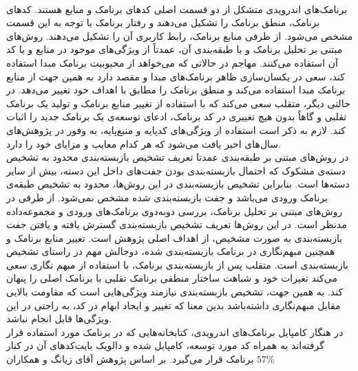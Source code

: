 \\
برنامک‌های اندرویدی متشکل از دو قسمت اصلی کد‌های برنامک و منابع هستند. کد‌های برنامک، منطق برنامک را تشکیل می‌دهند و رفتار برنامک با توجه به این قسمت مشخص  می‌شود. از طرفی منابع برنامک، رابط کاربری آن را تشکیل می‌دهند. روش‌های مبتنی بر تحلیل برنامک و یا طبقه‌بندی آن، عمدتاً از ویژگی‌های موجود در منابع و یا کد آن استفاده می‌کنند. مهاجم در حالاتی که می‌خواهد از محبوبیت برنامک مبدا استفاده کند، سعی در یکسان‌سازی ظاهر برنامک‌های مبدا و مقصد دارد به همین جهت از منابع برنامک مبدا استفاده می‌کند و منطق برنامک را مطابق با اهداف خود تغییر می‌دهد. در حالتی دیگر، متقلب سعی می‌کند که با استفاده از تغییر منابع برنامک و تولید یک برنامک تقلبی و گاهاً بدون هیچ تغییری در کد برنامک، ادعای توسعه‌ی یک برنامک جدید را اثبات کند. لازم به ذکر است استفاده از ویژگی‌های کد‌پایه و منبع‌پایه، به وفور در پژوهش‌های سال‌های اخیر یافت می‌شود که هر کدام معایب و مزایای خود را دارد.\\
در روش‌های مبتنی بر طبقه‌بندی عمدتا تعریف تشخیص بازبسته‌بندی محدود به تشخیص دسته‌ی مشکوک که احتمال بازبسته‌بندی بودن جفت‌های داخل این دسته‌، بیش از سایر دسته‌ها است. بنابراین تشخیص بازبسته‌بندی در این روش‌ها، محدود به تشخیص طبقه‌ی برنامک‌ ورودی می‌باشد و جفت بازبسته‌بندی شده مشخص نمی‌شود. از طرفی در روش‌های مبتنی بر تحلیل برنامک، بررسی دوبه‌دوی برنامک‌های ورودی و مجموعه‌داده مدنظر است. در این روش‌ها تعریف تشخیص بازبسته‌بندی گسترش یافته و یافتن جفت بازبسته‌بندی به صورت مشخیص، از اهداف اصلی پژوهش است.
تغییر منابع برنامک‌ و همچنین مبهم‌نگاری در برنامک بازبسته‌بندی شده، دوجالش مهم در راستای تشخیص بازبسته‌بندی است. متقلب پس از بازبسته‌بندی برنامک، با استفاده از مبهم نگاری سعی می‌کند تغیرات خود و شباهت ساختار منطقی برنامک تقلبی با برنامک اصلی را پنهان کند. به همین جهت، تشخیص بازبسته‌بندی نیازمند ویژگی‌هایی است که مقاومت بالایی مقابل مبهم‌نگاری داشته‌باشد بدین معنا که تغییر و ایجاد ابهام در کد، به راحتی در این ویژگی‌ها قابل انجام نباشد.
\\
در هنگار کامپایل برنامک‌های اندرویدی، کتابخانه‌هایی که در برنامک مورد استفاده قرار گرفته‌اند به همراه کد مورد توسعه، کامپایل شده و دالویک‌ بایت‌کد‌های آن در کنار برنامک قرار می‌گیرد. بر اساس پژوهش آقای زیانگ و همکاران 
$57\%$
